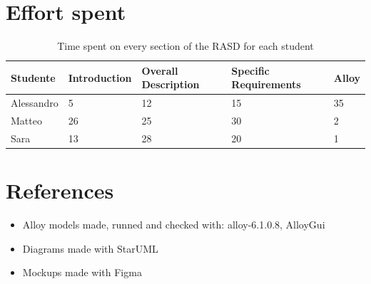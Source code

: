 \documentclass[12pt,a4paper]{article}
\begin{document}
\section{Effort spent}
\begin{table}[h]
  \centering
  \begin{tabular}{|p{1.5cm}|p{1.5cm}|p{1.5cm}|p{1.5cm}|p{1.5cm}|}
    \hline
     Studente & Introduction & Overall Description & Specific Requirements & Alloy \\
    \hline
    Alessandro & 5 & 12 & 15 & 35 \\
    \hline
    Matteo & 26 & 25 & 30 & 2 \\
    \hline
    Sara & 13 & 28 & 20 & 1 \\
    \hline
  \end{tabular}
  \caption{Time spent on every section of the RASD for each student}
  \label{tab:effort}
\end{table}
\clearpage

\section{References}
\begin{itemize}
  \item Alloy models made, runned and checked with: alloy-6.1.0.8, AlloyGui
  \item  Diagrams made with StarUML
  \item Mockups made with Figma
\end{itemize}
%
%
\end{document}
